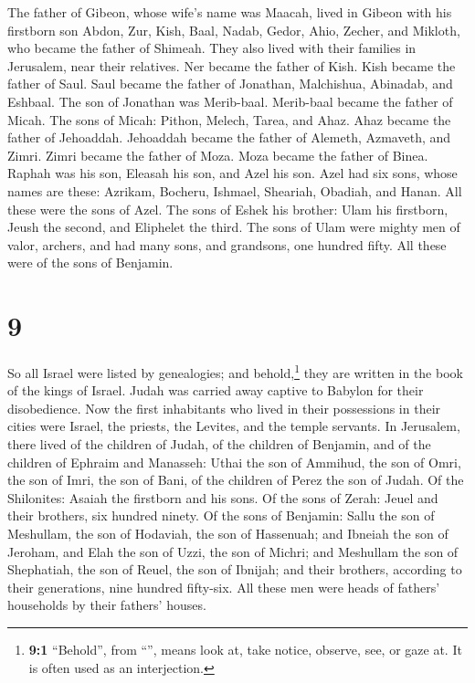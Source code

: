  The father of Gibeon, whose wife's name was Maacah,
lived in Gibeon  with his firstborn son Abdon, Zur, Kish,
Baal, Nadab,  Gedor, Ahio, Zecher,  and
Mikloth, who became the father of Shimeah. They also lived with their
families in Jerusalem, near their relatives.  Ner became
the father of Kish. Kish became the father of Saul. Saul became the
father of Jonathan, Malchishua, Abinadab, and Eshbaal. 
The son of Jonathan was Merib-baal. Merib-baal became the father of
Micah.  The sons of Micah: Pithon, Melech, Tarea, and
Ahaz.  Ahaz became the father of Jehoaddah. Jehoaddah
became the father of Alemeth, Azmaveth, and Zimri. Zimri became the
father of Moza.  Moza became the father of Binea. Raphah
was his son, Eleasah his son, and Azel his son.  Azel had
six sons, whose names are these: Azrikam, Bocheru, Ishmael, Sheariah,
Obadiah, and Hanan. All these were the sons of Azel.  The
sons of Eshek his brother: Ulam his firstborn, Jeush the second, and
Eliphelet the third.  The sons of Ulam were mighty men of
valor, archers, and had many sons, and grandsons, one hundred fifty. All
these were of the sons of Benjamin.

\hypertarget{section-8}{%
\section{9}\label{section-8}}

 So all Israel were listed by genealogies; and
behold,\footnote{\textbf{9:1} ``Behold'', from ``'', means
  look at, take notice, observe, see, or gaze at. It is often used as an
  interjection.} they are written in the book of the kings of Israel.
Judah was carried away captive to Babylon for their disobedience.
 Now the first inhabitants who lived in their possessions
in their cities were Israel, the priests, the Levites, and the temple
servants.  In Jerusalem, there lived of the children of
Judah, of the children of Benjamin, and of the children of Ephraim and
Manasseh:  Uthai the son of Ammihud, the son of Omri, the
son of Imri, the son of Bani, of the children of Perez the son of Judah.
 Of the Shilonites: Asaiah the firstborn and his sons.
 Of the sons of Zerah: Jeuel and their brothers, six
hundred ninety.  Of the sons of Benjamin: Sallu the son of
Meshullam, the son of Hodaviah, the son of Hassenuah;  and
Ibneiah the son of Jeroham, and Elah the son of Uzzi, the son of Michri;
and Meshullam the son of Shephatiah, the son of Reuel, the son of
Ibnijah;  and their brothers, according to their
generations, nine hundred fifty-six. All these men were heads of
fathers' households by their fathers' houses.

